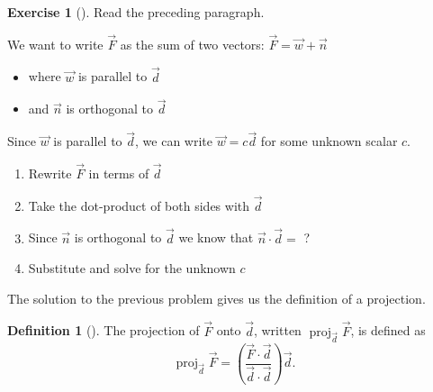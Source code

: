 \documentclass[10pt,]{book}
\theoremstyle{plain}
\theoremstyle{definition}
\newtheorem{definition}[theorem]{Definition}
\theoremstyle{definition}
\theoremstyle{definition}
\theoremstyle{definition}
\newtheorem{exploration}[project]{Exercise}
\theoremstyle{definition}
\numberwithin{equation}{section}
\DeclareMathOperator{\proj}{proj}
\begin{document}
\begin{exploration}[]\label{prob_force_intro}
Read the preceding paragraph.%
\par
We want to write \(\vec F\) as the sum of two vectors: \(\vec F = \vec w+\vec n\) \leavevmode%
\begin{itemize}[label=\textbullet]
\item{}where \(\vec w\) is parallel to \(\vec d\)%
\item{}and \(\vec n\) is orthogonal to \(\vec d\)%
\end{itemize}
%
\par
Since \(\vec w\) is parallel to \(\vec d\), we can write \(\vec w=c\vec d\) for some unknown scalar \(c\).%
\begin{enumerate}[font=\bfseries,label=(\alph*),ref=\alph*]
\item\label{task-83} Rewrite \(\vec F\) in terms of \(\vec d\)%
\item\label{task-84} Take the dot-product of both sides with \(\vec d\)%
\item\label{task-85} Since \(\vec n\) is orthogonal to \(\vec d\) we know that \(\vec n \cdot \vec d =\) ?%
\item\label{task-86} Substitute and solve for the unknown \(c\)%
\end{enumerate}
\end{exploration}
The solution to the previous problem gives us the definition of a projection.%
\begin{definition}[{}]\label{definition-11}
The projection of \(\vec F\) onto \(\vec d\), written \(\proj_{\vec d}\vec F\), is defined as%
\begin{equation*}
\proj_{\vec d}\vec F = \left(\frac{\vec F\cdot \vec d}{\vec d\cdot \vec d}\right)\vec d.
\end{equation*}
%
\end{definition}
\typeout{************************************************}
\typeout{************************************************}
\end{document}
